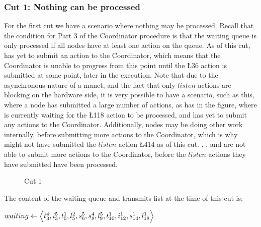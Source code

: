 \subsubsection{Cut 1: Nothing can be processed}
For the first cut we have a scenario where nothing may be processed. Recall that the condition for Part 3 of the Coordinator procedure is that the waiting queue is only processed if all nodes have at least one action on the queue. As of this cut,  has yet to submit an action to the Coordinator, which means that the Coordinator is unable to progress from this point until the \L{3}{6} action is submitted at some point, later in the execution. Note that due to the asynchronous nature of a \gls{manet}, and the fact that only $listen$ actions are blocking on the hardware side, it is very possible to have a scenario, such as this, where a node has submitted a large number of actions, as  has in the figure, where  is currently waiting for the \L{1}{18} action to be processed, and  has yet to submit any actions to the Coordinator. Additionally, nodes may be doing other work internally, before submitting more actions to the Coordinator, which is why  might not have submitted the $listen$ action \L{4}{14} as of this cut. , , and  are not able to submit more actions to the Coordinator, before the $listen$ actions they have submitted have been processed.

\begin{figure}[H]
    \centering
    \caption{Cut 1}\label{tikz:coordinatormsc1}
\end{figure}

The content of the waiting queue and transmits list at the time of this cut is: \smallbreak

$waiting \leftarrow \Big\langle%
    \T{4}{3}, %
    \I{5}{3}, %
    \T{1}{5}, %
    \L{2}{5}, %
    \S{5}{6}, %
    \S{4}{8}, %
    \L{5}{9}, %
    \T{1}{10}, %
    \I{1}{12}, %
    \S{1}{14}, %
    \L{1}{18} %
    \Big\rangle$

